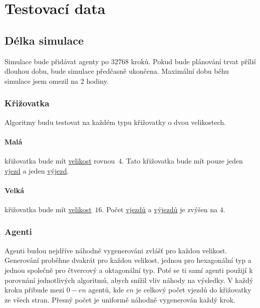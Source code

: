 \section{Testovací data}\label{sec:testovaci_data}


\subsection{Délka simulace}\label{subsec:delka_simulace}

Simulace bude přidávat agenty po $32768$ kroků.
Pokud bude plánování trvat příliš dlouhou dobu, bude simulace předčasně ukončena.
Maximální dobu běhu simulace jsem omezil na 2 hodiny.

\subsubsection{Křižovatka}

Algoritmy budu testovat na každém typu křižovatky o dvou velikostech.
\paragraph{Malá}\label{par:data_mala} křižovatka bude mít \hyperref[par:velikost_krizovatky]{velikost} rovnou~$4$.
Tato křižovatka bude mít pouze jeden \hyperref[par:vjezdy]{vjezd} a jeden \hyperref[par:vyjezdy]{výjezd}.
\paragraph{Velká}\label{par:data_velka} křižovatka bude mít \hyperref[par:velikost_krizovatky]{velikost}~$16$.
Počet \hyperref[par:vjezdy]{vjezdů} a \hyperref[par:vyjezdy]{výjezdů} je zvýšen na $4$.

\subsubsection{Agenti}

Agenti budou nejdříve náhodně vygenerováni zvlášť pro každou velikost.
Generování proběhne dvakrát pro každou velikost, jednou pro hexagonální typ a jednou společně pro čtvercový a oktagonální typ.
Poté se ti samí agenti použijí k porovnání jednotlivých algoritmů, abych snížil vliv náhody na výsledky.
V každý kroku přibude mezi $0 - en$ agentů, kde $en$ je celkový počet vjezdů do křižovatky ze všech stran.
Přesný počet je uniformě náhodně vygenerován každý krok.


